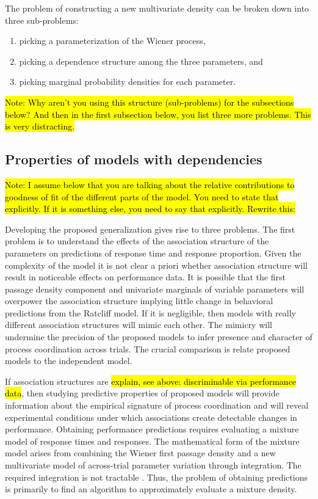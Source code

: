 \documentclass[12pt]{article}
\newcommand{\trish}[1]{\textrm{\hl{#1}}}
\begin{document}
The problem of constructing a
new multivariate density can be broken down into three sub-problems:
\begin{enumerate}
\item picking a parameterization of the Wiener process,
\item picking a dependence structure among the three parameters, and
\item picking marginal probability densities for each parameter.
\end{enumerate}

\trish{Note: Why aren't you using this structure (sub-problems) for the
subsections below?  And then in the first subsection below, you list three
more problems.  This is very distracting.}

\subsection{Properties of models with dependencies}					     


\trish{Note: I assume below that you are talking about the relative
contributions to goodness of fit of the different parts of the model.  You
need to state that explicitly.  If it is something else, you need to say
that explicitly.  Rewrite this:}

Developing the proposed
generalization gives rise to three  problems. The
first problem is to understand the effects of the association structure
of the parameters on predictions of response time and response
proportion. Given the complexity of the model it is not clear a priori
whether association structure will result in noticeable effects on performance data. It is possible that the first passage density component and
univariate marginals of variable parameters will overpower the association
structure implying little change in behavioral predictions from the Ratcliff model. If it
is negligible, then models with really different association structures
will mimic each other. The mimicry will undermine the precision of the
proposed models to infer presence and character of process coordination
across trials. The crucial comparison is relate proposed models to the
independent model.
    
If association structures are \trish{explain, see above: discriminable via
performance data}, then studying predictive properties of proposed models
will provide information about the empirical signature of process
coordination and will reveal experimental conditions under which
associations create detectable changes in performance.  Obtaining
performance predictions requires evaluating a mixture model of response
times and responses. The mathematical form of the mixture model arises from
combining the Wiener first passage density and a new multivariate model of
across-trial parameter variation through integration. The required
integration is not tractable \citep{Tue2004}. Thus, the problem of
obtaining predictions is primarily to find an algorithm to approximately
evaluate a mixture density.
    
\end{document}
